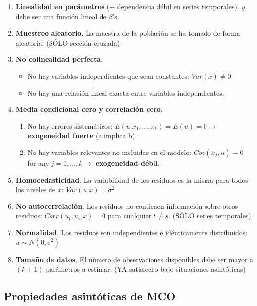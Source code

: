 \documentclass[10pt, a4paper, landscape]{extarticle}
\begin{document}
\begin{multicols}{3}
\begin{enumerate}[leftmargin=*]
\item \textbf{Linealidad en parámetros} (+ dependencia débil en series temporales). $y$ debe ser una función lineal de $\beta$'s.
\item \textbf{Muestreo aleatorio}. La muestra de la población se ha tomado de forma aleatoria. (SÓLO sección cruzada)
\item \textbf{No colinealidad perfecta}.
\begin{itemize}[leftmargin=*]
\item No hay variables independientes que sean constantes: $Var(x) \neq 0$
\item No hay una relación lineal exacta entre variables independientes.
\end{itemize}
\item \textbf{Media condicional cero y correlación cero}.
\begin{enumerate}[leftmargin=*, label=\alph*.]
\item No hay errores sistemáticos: $E(u | x_1, ..., x_k) = E(u) = 0 \rightarrow$ \textbf{exogeneidad fuerte} (a implica b).
\item No hay variables relevantes no incluidas en el modelo: $Cov(x_j , u) = 0$ for any $j = 1, ..., k \rightarrow$ \textbf{exogeneidad débil}.
\end{enumerate}
\item \textbf{Homocedasticidad}. La variabilidad de los residuos es la misma para todos los niveles de $x$: $Var(u | x) = \sigma^2$
\item \textbf{No autocorrelación}. Los residuos no contienen información sobre otros residuos: $Corr(u_t, u_s | x) = 0$ para cualquier $t \neq s$. (SÓLO series temporales)
\item \textbf{Normalidad}. Los residuos son independientes e idénticamente distribuidos: $u \sim N(0,\sigma^2)$
\item \textbf{Tamaño de datos}. El número de observaciones disponibles debe ser mayor a $(k + 1)$ parámetros a estimar. (YA satisfecho bajo situaciones asintóticas)
\end{enumerate}

\subsection*{Propiedades asintóticas de MCO}


\end{multicols}
\end{document}
